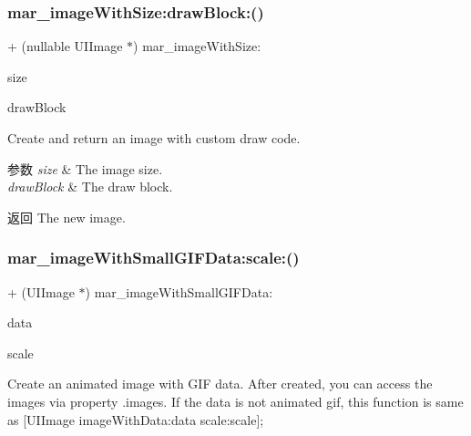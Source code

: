 \subsubsection{\texorpdfstring{mar\+\_\+image\+With\+Size\+:draw\+Block\+:()}{mar\_imageWithSize:drawBlock:()}\hspace{0.1cm}{\footnotesize\ttfamily [2/2]}}
{\footnotesize\ttfamily + (nullable U\+I\+Image $\ast$) mar\+\_\+image\+With\+Size\+: \begin{DoxyParamCaption}\item[{(C\+G\+Size)}]{size }\item[{drawBlock:(void($^\wedge$)(C\+G\+Context\+Ref context))}]{draw\+Block }\end{DoxyParamCaption}}

Create and return an image with custom draw code.


\begin{DoxyParams}{参数}
{\em size} & The image size. \\
\hline
{\em draw\+Block} & The draw block.\\
\hline
\end{DoxyParams}
\begin{DoxyReturn}{返回}
The new image. 
\end{DoxyReturn}
\mbox{\label{category_u_i_image_07_m_a_r_e_x_08_a158c590ad06766cae9e9b9309ce9bdde}} 
\subsubsection{\texorpdfstring{mar\+\_\+image\+With\+Small\+G\+I\+F\+Data\+:scale\+:()}{mar\_imageWithSmallGIFData:scale:()}}
{\footnotesize\ttfamily + (U\+I\+Image $\ast$) mar\+\_\+image\+With\+Small\+G\+I\+F\+Data\+: \begin{DoxyParamCaption}\item[{(N\+S\+Data $\ast$)}]{data }\item[{scale:(C\+G\+Float)}]{scale }\end{DoxyParamCaption}}

Create an animated image with G\+IF data. After created, you can access the images via property \textquotesingle{}.images\textquotesingle{}. If the data is not animated gif, this function is same as \mbox{[}U\+I\+Image image\+With\+Data\+:data scale\+:scale\mbox{]};

